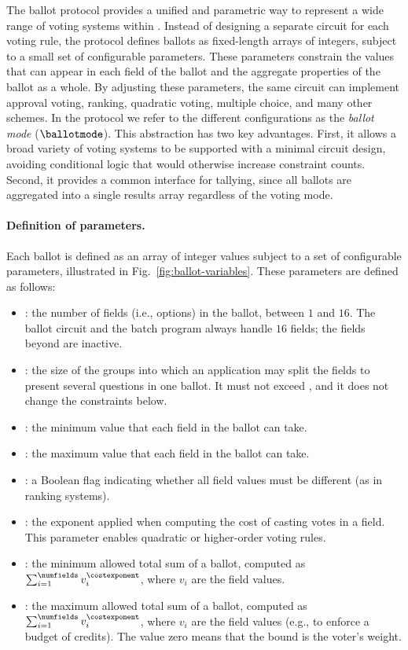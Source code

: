 
The ballot protocol provides a unified and parametric way to represent a wide range of voting systems within \davinci. Instead of designing a separate circuit for each voting rule, the protocol defines ballots as fixed-length arrays of integers, subject to a small set of configurable parameters. These parameters constrain the values that can appear in each field of the ballot and the aggregate properties of the ballot as a whole. By adjusting these parameters, the same circuit can implement approval voting, ranking, quadratic voting, multiple choice, and many other schemes. In the protocol we refer to the different configurations as the \emph{ballot mode} ($\ballotmode$). This abstraction has two key advantages. First, it allows a broad variety of voting systems to be supported with a minimal circuit design, avoiding conditional logic that would otherwise increase constraint counts. Second, it provides a common interface for tallying, since all ballots are aggregated into a single results array regardless of the voting mode.

\paragraph{Definition of parameters.}
Each ballot is defined as an array of integer values subject to a set of configurable parameters, illustrated in Fig.~\ref{fig:ballot-variables}. These parameters are defined as follows:
\begin{itemize}
	\item \numfields: the number of fields (i.e., options) in the ballot, between $1$ and $16$. The ballot circuit and the batch program always handle $16$ fields; the fields beyond \numfields are inactive.
	\item \groupsize: the size of the groups into which an application may split the fields to present several questions in one ballot. It must not exceed \numfields, and it does not change the constraints below.
	\item \minvalue: the minimum value that each field in the ballot can take.
	\item \maxvalue: the maximum value that each field in the ballot can take.
	\item \uniquevalues: a Boolean flag indicating whether all field values must be different (as in ranking systems).
	\item \costexponent: the exponent applied when computing the cost of casting votes in a field. This parameter enables quadratic or higher-order voting rules.
	\item \minvaluesum: the minimum allowed total sum of a ballot, computed as $\sum_{i=1}^{\numfields} v_i^{\costexponent}$,
	where $v_i$ are the field values.
	\item \maxvaluesum: the maximum allowed total sum of a ballot, computed as $\sum_{i=1}^{\numfields} v_i^{\costexponent}$, where $v_i$ are the field values (e.g., to enforce a budget of credits). The value zero means that the bound is the voter's weight.
\end{itemize}

